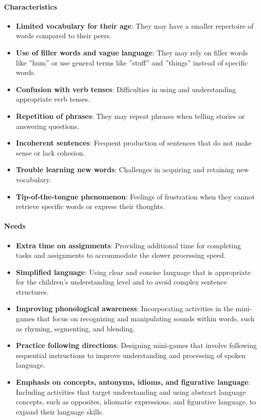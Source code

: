 \paragraph{Characteristics}
\begin{itemize}
    \item \textbf{Limited vocabulary for their age}: They may have a smaller repertoire of words compared to their peers.
    \item \textbf{Use of filler words and vague language}: They may rely on filler words like ''hum'' or use general terms like ''stuff'' and ''things'' instead of specific words.
    \item \textbf{Confusion with verb tenses}: Difficulties in using and understanding appropriate verb tenses.
    \item \textbf{Repetition of phrases}: They may repeat phrases when telling stories or answering questions.
    \item \textbf{Incoherent sentences}: Frequent production of sentences that do not make sense or lack cohesion.
    \item \textbf{Trouble learning new words}: Challenges in acquiring and retaining new vocabulary.
    \item \textbf{Tip-of-the-tongue phenomenon}: Feelings of frustration when they cannot retrieve specific words or express their thoughts.
\end{itemize}

\paragraph{Needs}
\begin{itemize}
    \item \textbf{Extra time on assignments}: Providing additional time for completing tasks and assignments to accommodate the slower processing speed.
    \item \textbf{Simplified language}: Using clear and concise language that is appropriate for the children's understanding level and to avoid complex sentence structures.
    \item \textbf{Improving phonological awareness}: Incorporating activities in the mini-games that focus on recognizing and manipulating sounds within words, such as rhyming, segmenting, and blending.
    \item \textbf{Practice following directions}: Designing mini-games that involve following sequential instructions to improve understanding and processing of spoken language.
    \item \textbf{Emphasis on concepts, antonyms, idioms, and figurative language}: Including activities that target understanding and using abstract language concepts, such as opposites, idiomatic expressions, and figurative language, to expand their language skills.
\end{itemize}
